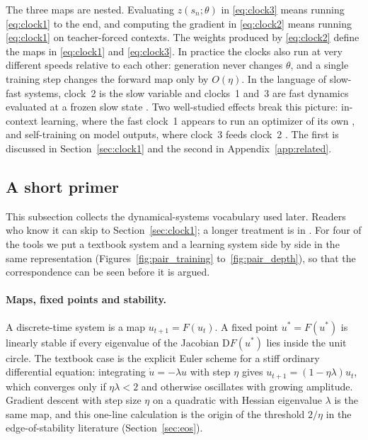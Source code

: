 The three maps are nested. Evaluating $z(s_n;\theta)$ in \eqref{eq:clock3} means running \eqref{eq:clock1} to the end, and computing the gradient in \eqref{eq:clock2} means running \eqref{eq:clock1} on teacher-forced contexts. The weights produced by \eqref{eq:clock2} define the maps in \eqref{eq:clock1} and \eqref{eq:clock3}. In practice the clocks also run at very different speeds relative to each other: generation never changes $\theta$, and a single training step changes the forward map only by $O(\eta)$. In the language of slow-fast systems, clock~2 is the slow variable and clocks~1 and~3 are fast dynamics evaluated at a frozen slow state \citep{strogatz2018nonlinear}. Two well-studied effects break this picture: in-context learning, where the fast clock~1 appears to run an optimizer of its own \citep{oswald2022transformers,akyurek2022learning}, and self-training on model outputs, where clock~3 feeds clock~2 \citep{shumailov2023curse,bertrand2023stability}. The first is discussed in Section~\ref{sec:clock1} and the second in Appendix~\ref{app:related}.

\subsection{A short primer}
\label{sec:tools}

This subsection collects the dynamical-systems vocabulary used later. Readers who know it can skip to Section~\ref{sec:clock1}; a longer treatment is in \citet{strogatz2018nonlinear}. For four of the tools we put a textbook system and a learning system side by side in the same representation (Figures~\ref{fig:pair_training} to~\ref{fig:pair_depth}), so that the correspondence can be seen before it is argued.

\paragraph{Maps, fixed points and stability.} A discrete-time system is a map $u_{t+1}=F(u_t)$. A fixed point $u^\ast=F(u^\ast)$ is linearly stable if every eigenvalue of the Jacobian $\mathrm{D}F(u^\ast)$ lies inside the unit circle. The textbook case is the explicit Euler scheme for a stiff ordinary differential equation: integrating $\dot u=-\lambda u$ with step $\eta$ gives $u_{t+1}=(1-\eta\lambda)u_t$, which converges only if $\eta\lambda<2$ and otherwise oscillates with growing amplitude. Gradient descent with step size $\eta$ on a quadratic with Hessian eigenvalue $\lambda$ is the same map, and this one-line calculation is the origin of the threshold $2/\eta$ in the edge-of-stability literature (Section~\ref{sec:eos}).

